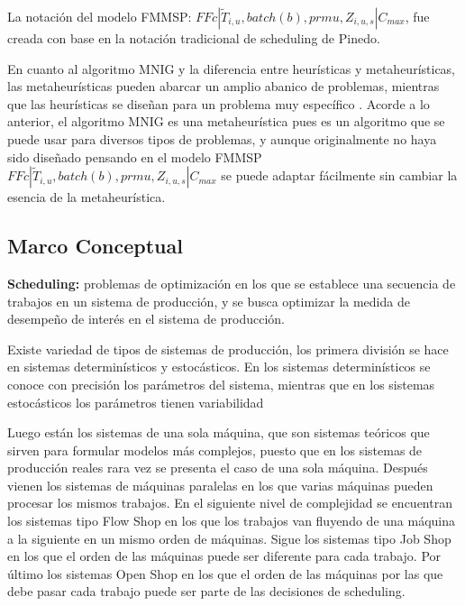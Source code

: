 \documentclass{article}
\def\notac_modelo{$FFc | \tilde{T}_{i, u}, batch(b), prmu, Z_{i, u, s} | C_{max}$}
\begin{document}
\vspace{\baselineskip}
La notación del modelo FMMSP: \notac_modelo, fue creada con base en la notación tradicional de scheduling de Pinedo. \autocite{schedPinedo}

\vspace{\baselineskip}
En cuanto al algoritmo MNIG y la diferencia entre heurísticas y metaheurísticas, las metaheurísticas pueden abarcar un amplio abanico de problemas, mientras que las heurísticas se diseñan para un problema muy específico \autocite{metaTalbi}. Acorde a lo anterior, el algoritmo MNIG es una metaheurística pues es un algoritmo que se puede usar para diversos tipos de problemas, y aunque originalmente no haya sido diseñado pensando en el modelo FMMSP \linebreak \notac_modelo se puede adaptar fácilmente sin cambiar la esencia de la metaheurística.

\subsection{Marco Conceptual}

\indent\indent
\textbf{Scheduling:} problemas de optimización en los que se establece una secuencia de trabajos en un sistema de producción, y se busca optimizar la medida de desempeño de interés en el sistema de producción.

\vspace{\baselineskip}
Existe variedad de tipos de sistemas de producción, los primera división se hace en sistemas determinísticos y estocásticos. En los sistemas determinísticos se conoce con precisión los parámetros del sistema, mientras que en los sistemas estocásticos los parámetros tienen variabilidad \autocite{schedPinedo}

\vspace{\baselineskip}
Luego están los sistemas de una sola máquina, que son sistemas teóricos que sirven para formular modelos más complejos, puesto que en los sistemas de producción reales rara vez se presenta el caso de una sola máquina. Después vienen los sistemas de máquinas paralelas en los que varias máquinas pueden procesar los mismos trabajos. En el siguiente nivel de complejidad se encuentran los sistemas tipo Flow Shop en los que los trabajos van fluyendo de una máquina a la siguiente en un mismo orden de máquinas. Sigue los sistemas tipo Job Shop en los que el orden de las máquinas puede ser diferente para cada trabajo. Por último los sistemas Open Shop en los que el orden de las máquinas por las que debe pasar cada trabajo puede ser parte de las decisiones de scheduling. \autocite{schedPinedo}
\end{document}
